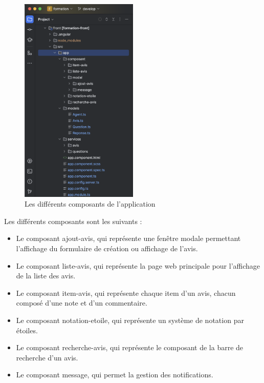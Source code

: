     \begin{figure}[h!]
        \centering
        \includegraphics[width=0.5\textwidth]{images/code/composant.png}
        \caption{Les différents composants de l'application}
    \end{figure}
    \medskip

    Les différents composants sont les suivants :
    \medskip

    \begin{itemize}
        \item Le composant ajout-avis, qui représente une fenêtre modale permettant l'affichage du formulaire de création ou affichage de l'avis.
        \item Le composant liste-avis, qui représente la page web principale pour l'affichage de la liste des avis.
        \item Le composant item-avis, qui représente chaque item d'un avis, chacun composé d'une note et d'un commentaire.
        \item Le composant notation-etoile, qui représente un système de notation par étoiles.
        \item Le composant recherche-avis, qui représente le composant de la barre de recherche d'un avis.
        \item Le composant message, qui permet la gestion des notifications.
    \end{itemize}
    \vspace{0.5cm}

